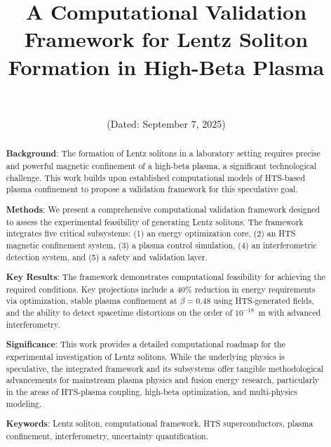 \documentclass[12pt,a4paper]{article}
\begin{document}
\title{A Computational Validation Framework for Lentz Soliton Formation in High-Beta Plasma}

\author{\authorname\\\texttt{\authoremail}}
\date{(Dated: September 7, 2025)}

\maketitle

\begin{abstract}
\textbf{Background}: The formation of Lentz solitons in a laboratory setting requires precise and powerful magnetic confinement of a high-beta plasma, a significant technological challenge. This work builds upon established computational models of HTS-based plasma confinement to propose a validation framework for this speculative goal.

\textbf{Methods}: We present a comprehensive computational validation framework designed to assess the experimental feasibility of generating Lentz solitons. The framework integrates five critical subsystems: (1) an energy optimization core, (2) an HTS magnetic confinement system, (3) a plasma control simulation, (4) an interferometric detection system, and (5) a safety and validation layer.

\textbf{Key Results}: The framework demonstrates computational feasibility for achieving the required conditions. Key projections include a 40\% reduction in energy requirements via optimization, stable plasma confinement at $\beta=0.48$ using HTS-generated fields, and the ability to detect spacetime distortions on the order of $10^{-18}$~m with advanced interferometry.

\textbf{Significance}: This work provides a detailed computational roadmap for the experimental investigation of Lentz solitons. While the underlying physics is speculative, the integrated framework and its subsystems offer tangible methodological advancements for mainstream plasma physics and fusion energy research, particularly in the areas of HTS-plasma coupling, high-beta optimization, and multi-physics modeling.

\textbf{Keywords}: Lentz soliton, computational framework, HTS superconductors, plasma confinement, interferometry, uncertainty quantification.
\end{abstract}
\end{document}
